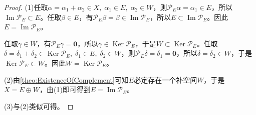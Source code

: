 \begin{proof}
	(1)任取$\alpha=\alpha_1+\alpha_2\in X,\;\alpha_1\in E,\;\alpha_2\in W$，则$\mathcal{P}_E\alpha=\alpha_1\in E$，所以$\operatorname{Im}\mathcal{P}_E\subset E$。任取$\beta\in E$，有$\mathcal{P}_E\beta=\beta\in\operatorname{Im}\mathcal{P}_E$，所以$E\subset\operatorname{Im}\mathcal{P}_E$。因此$E=\operatorname{Im}\mathcal{P}_E$。\par
	任取$\gamma\in W$，有$\mathcal{P}_E\gamma=\mathbf{0}$，所以$\gamma\in\operatorname{Ker}\mathcal{P}_E$，于是$W\subset\operatorname{Ker}\mathcal{P}_E$。任取$\delta=\delta_1+\delta_2\in\operatorname{Ker}\mathcal{P}_E,\;\delta_1\in E,\;\delta_2\in W$，则$\mathcal{P}_E\delta=\delta_1=\mathbf{0}$，所以$\delta=\delta_2\in W$，于是$\operatorname{Ker}\mathcal{P}_E\subset W$。因此$W=\operatorname{Ker}\mathcal{P}_E$。\par
	(2)由\cref{theo:ExistenceOfComplement}可知$E$必定存在一个补空间$W$，于是$X=E\oplus W$，由(1)即可得到$E=\operatorname{Im}\mathcal{P}_E$。\par
	(3)与(2)类似可得。
	
\end{proof}